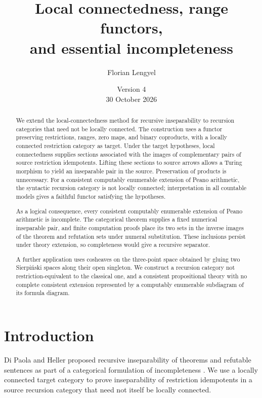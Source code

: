 \documentclass[11pt]{article}
\title{Local connectedness, range functors,\\
and essential incompleteness}
\author{Florian Lengyel}
\date{Version 4\\30 October 2026}
\begin{document}
\maketitle

\begin{abstract}
We extend the local-connectedness method for recursive inseparability
to recursion categories that need not be locally connected. The
construction uses a functor preserving restrictions, ranges, zero maps,
and binary coproducts, with a locally connected restriction category as
target. Under the target hypotheses, local connectedness supplies
sections associated with the images of complementary pairs of source
restriction idempotents. Lifting these sections to source arrows allows
a Turing morphism to yield an inseparable pair in the source.
Preservation of products is unnecessary.
For a consistent computably enumerable extension of Peano arithmetic,
the syntactic recursion category is not locally connected;
interpretation in all countable models gives a faithful functor
satisfying the hypotheses.

As a logical consequence, every consistent computably enumerable
extension of Peano arithmetic is incomplete. The categorical theorem
supplies a fixed numerical inseparable pair, and finite computation
proofs place its two sets in the inverse images of the theorem and
refutation sets under numeral substitution. These inclusions persist
under theory extension, so completeness would give a recursive separator.

A further application uses cosheaves on the three-point space obtained
by gluing two Sierpi\'nski spaces along their open singleton. We construct
a recursion category not restriction-equivalent to the classical one,
and a consistent propositional theory with no complete consistent
extension represented by a computably enumerable subdiagram of its
formula diagram.
\end{abstract}

\section{Introduction}

Di Paola and Heller proposed recursive inseparability of theorems and
refutable sentences as part of a categorical formulation of
incompleteness \cite[pp.~594--595]{DPH}. We use a locally connected
target category to prove inseparability of restriction idempotents in
a source recursion category that need not itself be locally connected.
\end{document}
